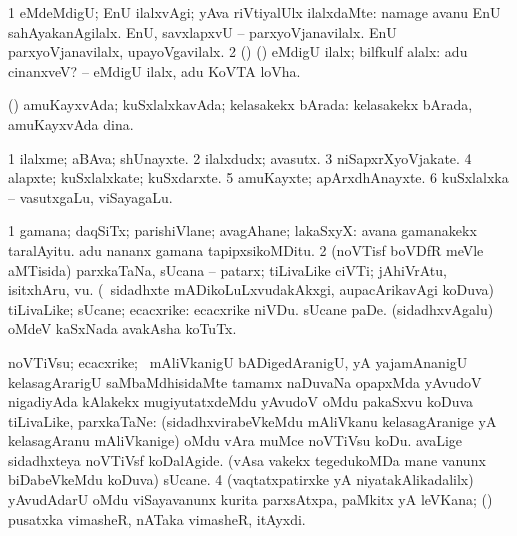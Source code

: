 \bentry
{}
\gl{\kirxvi}
\bmng
\bnum
\num{1} eMdeMdigU; EnU ilalxvAgi; yAva riVtiyalUlx ilalxdaMte:  namage avanu EnU sahAyakanAgilalx.  EnU, savxlapxvU -- parxyoVjanavilalx.  EnU parxyoVjanavilalx, upayoVgavilalx. 
\num{2} (\ame) (\AmA) eMdigU ilalx; bilfkulf alalx:  adu cinanxveV? -- eMdigU ilalx, adu KoVTA loVha. 
\enum
\emng
\eentry

\bentry
{}
\gl{\gu}
\bmng
(\AmA) amuKayxvAda; kuSxlalxkavAda; kelasakekx bArada:  kelasakekx bArada, amuKayxvAda dina. 
\emng
\eentry 

\bentry
{}
\gl{\nA}
\bmng
\bnum
\num{1} ilalxme; aBAva; shUnayxte. 
\num{2} ilalxdudx; avasutx. 
\num{3} niSapxrXyoVjakate. 
\num{4} alapxte; kuSxlalxkate; kuSxdarxte. 
\num{5} amuKayxte; apArxdhAnayxte. 
\num{6} kuSxlalxka -- vasutxgaLu, viSayagaLu. 
\enum
\emng
\eentry

\bentry
{}
\gl{\nA}
\bmng
\bnum
\num{1} gamana; daqSiTx; parishiVlane; avagAhane; lakaSxyX:  avana gamanakekx taralAyitu.  adu nananx gamana tapipxsikoMDitu. 
\num{2} (noVTisf boVDfR meVle aMTisida) parxkaTaNa, sUcana -- patarx; tiLivaLike ciVTi; jAhiVrAtu, isitxhAru, \mo vu. 
\banum
{} (\kanmu\ sidadhxte mADikoLuLxvudakAkxgi, aupacArikavAgi koDuva) tiLivaLike; sUcane; ecacxrike:  ecacxrike niVDu.  sUcane paDe.  (sidadhxvAgalu) oMdeV kaSxNada avakAsha koTuTx. 
 noVTiVsu; ecacxrike; \kanmu\ mAliVkanigU bADigedAranigU, yA yajamAnanigU kelasagArarigU saMbaMdhisidaMte tamamx naDuvaNa opapxMda yAvudoV nigadiyAda kAlakekx mugiyutatxdeMdu yAvudoV oMdu pakaSxvu koDuva tiLivaLike, parxkaTaNe:  (sidadhxvirabeVkeMdu mAliVkanu kelasagAranige yA kelasagAranu mAliVkanige) oMdu vAra muMce noVTiVsu koDu.  avaLige sidadhxteya noVTiVsf koDalAgide.  (vAsa \mo vakekx tegedukoMDa mane \mo vanunx biDabeVkeMdu koDuva) sUcane. 
\eanum
\numie
\num{4} (vaqtatxpatirxke yA niyatakAlikadalilx) yAvudAdarU oMdu viSayavanunx kurita parxsAtxpa, paMkitx yA leVKana; (\kanmu) pusatxka vimasheR, nATaka vimasheR, itAyxdi. 
\enum
\emng

